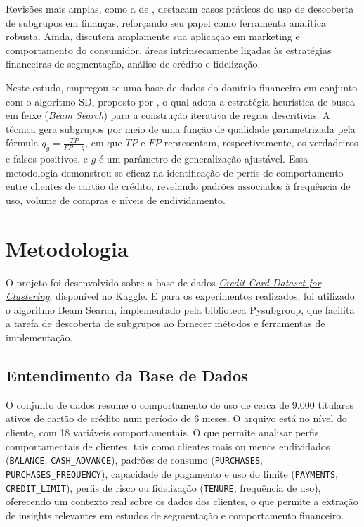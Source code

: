 \documentclass[12pt]{article}
\begin{document}
Revisões mais amplas, como a de \cite{helal:16}, destacam casos práticos do uso de descoberta de subgrupos em finanças, reforçando seu papel como ferramenta analítica robusta. Ainda, \cite{herrera:10} discutem amplamente sua aplicação em marketing e comportamento do consumidor, áreas intrinsecamente ligadas às estratégias financeiras de segmentação, análise de crédito e fidelização.

Neste estudo, empregou-se uma base de dados do domínio financeiro em conjunto com o algoritmo SD, proposto por \cite{gamberger:02}, o qual adota a estratégia heurística de busca em feixe (\textit{Beam Search}) para a construção iterativa de regras descritivas. A técnica gera subgrupos por meio de uma função de qualidade parametrizada pela fórmula $q_g = \frac{TP}{FP + g}$, em que $TP$ e $FP$ representam, respectivamente, os verdadeiros e falsos positivos, e $g$ é um parâmetro de generalização ajustável. Essa metodologia demonstrou-se eficaz na identificação de perfis de comportamento entre clientes de cartão de crédito, revelando padrões associados à frequência de uso, volume de compras e níveis de endividamento.

\section{Metodologia}

O projeto foi desenvolvido sobre a base de dados \href{https://www.kaggle.com/datasets/arjunbhasin2013/ccdata/data}{\textit{Credit Card Dataset for Clustering}}, disponível no Kaggle. E para os experimentos realizados, foi utilizado o algoritmo Beam Search, implementado pela biblioteca Pysubgroup, que facilita a tarefa de descoberta de subgrupos ao fornecer métodos e ferramentas de implementação.

\subsection{Entendimento da Base de Dados}

O conjunto de dados resume o comportamento de uso de cerca de 9.000 titulares ativos de cartão de crédito num período de 6 meses. O arquivo está no nível do cliente, com 18 variáveis comportamentais. O que permite analisar perfis comportamentais de clientes, tais como clientes mais ou menos endividados (\texttt{BALANCE}, \texttt{CASH\_ADVANCE}), padrões de consumo (\texttt{PURCHASES}, \texttt{PURCHASES\_FREQUENCY}), capacidade de pagamento e uso do limite (\texttt{PAYMENTS}, \texttt{CREDIT\_LIMIT}), perfis de risco ou fidelização (\texttt{TENURE}, frequência de uso), oferecendo um contexto real sobre os dados dos clientes, o que permite a extração de insights relevantes em estudos de segmentação e comportamento financeiro.
\end{document}
